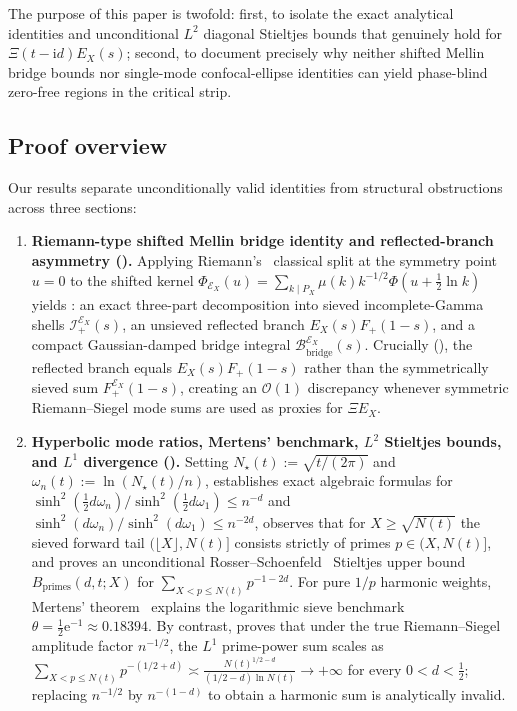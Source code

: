 \documentclass[11pt,reqno]{amsart}
\theoremstyle{plain}
\theoremstyle{definition}
\theoremstyle{remark}
\numberwithin{equation}{section}
\newcommand{\ii}{\mathrm{i}}
\newcommand{\ee}{\mathrm{e}}
\begin{document}
The purpose of this paper is twofold: first, to isolate the exact analytical identities and unconditional $L^2$ diagonal Stieltjes bounds that genuinely hold for $\Xi(t - \ii d)E_X(s)$; second, to document precisely why neither shifted Mellin bridge bounds nor single-mode confocal-ellipse identities can yield phase-blind zero-free regions in the critical strip.

\subsection{Proof overview}\label{subsec:overview}

Our results separate unconditionally valid identities from structural obstructions across three sections:
\begin{enumerate}[label=\textup{(\arabic*)},leftmargin=2.2em]
\item \textbf{Riemann-type shifted Mellin bridge identity and reflected-branch asymmetry ().} Applying Riemann's~\cite{riemann1859} classical split at the symmetry point $u = 0$ to the shifted kernel $\Phi_{\mathcal{E}_X}(u) = \sum_{k \mid P_X} \mu(k)k^{-1/2}\Phi(u + \frac{1}{2}\ln k)$ yields : an exact three-part decomposition into sieved incomplete-Gamma shells $\mathcal{I}_+^{\mathcal{E}_X}(s)$, an unsieved reflected branch $E_X(s)F_+(1 - s)$, and a compact Gaussian-damped bridge integral $\mathcal{B}_{\mathrm{bridge}}^{\mathcal{E}_X}(s)$. Crucially (), the reflected branch equals $E_X(s)F_+(1 - s)$ rather than the symmetrically sieved sum $F_+^{\mathcal{E}_X}(1 - s)$, creating an $\mathcal{O}(1)$ discrepancy whenever symmetric Riemann--Siegel mode sums are used as proxies for $\Xi E_X$.
\item \textbf{Hyperbolic mode ratios, Mertens' benchmark, $L^2$ Stieltjes bounds, and $L^1$ divergence ().} Setting $N_\star(t) := \sqrt{t/(2\pi)}$ and $\omega_n(t) := \ln(N_\star(t)/n)$,  establishes exact algebraic formulas for $\sinh^2(\frac{1}{2}d\omega_n)/\sinh^2(\frac{1}{2}d\omega_1) \le n^{-d}$ and $\sinh^2(d\omega_n)/\sinh^2(d\omega_1) \le n^{-2d}$, observes that for $X \ge \sqrt{N(t)}$ the sieved forward tail $(\lfloor X\rfloor, N(t)]$ consists strictly of primes $p \in (X, N(t)]$, and proves an unconditional Rosser--Schoenfeld~\cite{rosserschoenfeld1962} Stieltjes upper bound $B_{\mathrm{primes}}(d,t; X)$ for $\sum_{X < p \le N(t)} p^{-1-2d}$. For pure $1/p$ harmonic weights, Mertens' theorem~\cite{mertens1874} explains the logarithmic sieve benchmark $\theta = \frac{1}{2}\ee^{-1} \approx 0.18394$. By contrast,  proves that under the true Riemann--Siegel amplitude factor $n^{-1/2}$, the $L^1$ prime-power sum scales as $\sum_{X < p \le N(t)} p^{-(1/2+d)} \asymp \frac{N(t)^{1/2-d}}{(1/2-d)\ln N(t)} \to +\infty$ for every $0 < d < \frac{1}{2}$; replacing $n^{-1/2}$ by $n^{-(1-d)}$ to obtain a harmonic sum is analytically invalid.

\end{enumerate}
\end{document}
